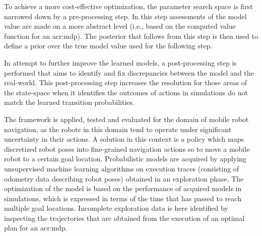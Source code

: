 
To achieve a more cost-effective optimization, the parameter search space is first narrowed down by a pre-processing step.
In this step assessments of the model value are made on a more abstract level (i.e., based on the computed value function for an \acrshort{acr:mdp}).
The posterior that follows from this step is then used to define a prior over the true model value used for the following step.

In attempt to further improve the learned models, a post-processing step is performed that aims to identify and fix discrepancies between the model and the real-world.
This post-processing step increases the resolution for those areas of the state-space when it identifies the outcomes of actions in simulations do not match the learned transition probabilities.

The framework is applied, tested and evaluated for the domain of mobile robot navigation, as the robots in this domain tend to operate under significant uncertainty in their actions.
A solution in this context is a policy which maps discretized robot poses into fine-grained navigation actions so to move a mobile robot to a certain goal location.
Probabilistic models are acquired by applying unsupervised machine learning algorithms on execution traces (consisting of odometry data describing robot poses) obtained in an exploration phase.
The optimization of the model is based on the performance of acquired models in simulations, which is expressed in terms of the time that has passed to reach multiple goal locations.
Incomplete exploration data is here identified by inspecting the trajectories that are obtained from the execution of an optimal plan for an \acrshort{acr:mdp}.



